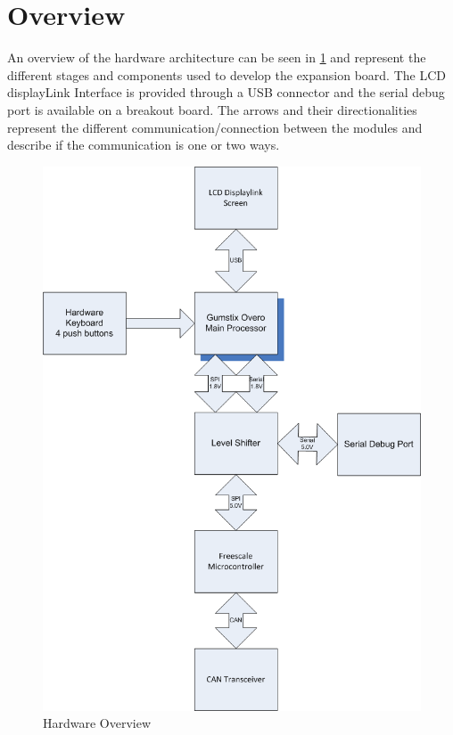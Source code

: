 \documentclass[11pt]{report} %
\begin{document}
	\section{Overview}
	An overview of the hardware architecture can be seen in \ref{fig:hardware_diagram}
	and represent the different stages and components used to develop the expansion
	board. The LCD displayLink Interface is provided through a USB connector and the
	serial debug port is available on a breakout board. The arrows and their directionalities
	represent the different communication/connection between the modules and
	describe if the communication is one or two ways.
	\begin{figure}[H]
		\centering
		\includegraphics[scale=0.45]{images/hardware_diagram.png}
		\caption{Hardware Overview}\label{fig:hardware_diagram}
	\end{figure}
	
\end{document}

